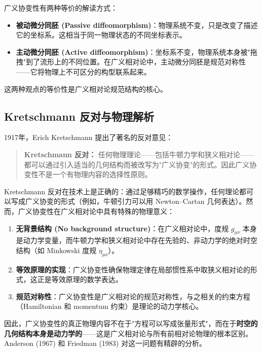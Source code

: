\begin{note}[主动与被动观点]
广义协变性有两种等价的解读方式：
\begin{itemize}
    \item \textbf{被动微分同胚 (Passive diffeomorphism)}：物理系统不变，只是改变了描述它的坐标系。这相当于同一物理状态的不同坐标表示。
    \item \textbf{主动微分同胚 (Active diffeomorphism)}：坐标系不变，物理系统本身被"拖拽"到了流形上的不同位置。在广义相对论中，主动微分同胚是规范对称性——它将物理上不可区分的构型联系起来。
\end{itemize}
这两种观点的等价性是广义相对论规范结构的核心。
\end{note}

\subsection{Kretschmann 反对与物理解析}

1917年，Erich Kretschmann 提出了著名的反对意见：

\begin{quote}
    \textbf{Kretschmann 反对：} 任何物理理论——包括牛顿力学和狭义相对论——都可以通过引入适当的几何结构而被改写为"广义协变"的形式。因此广义协变性不是一个有物理内容的选择性原则。
\end{quote}

\begin{note}
Kretschmann 反对在技术上是正确的：通过足够精巧的数学操作，任何理论都可以写成广义协变的形式（例如，牛顿引力可以用 Newton--Cartan 几何表达）。然而，广义协变性在广义相对论中具有特殊的物理意义：
\begin{enumerate}
    \item \textbf{无背景结构 (No background structure)}：在广义相对论中，度规 $g_{\mu\nu}$ 本身是动力学变量，而牛顿力学和狭义相对论中存在先验的、非动力学的绝对时空结构（如 Minkowski 度规 $\eta_{\mu\nu}$）。
    \item \textbf{等效原理的实现}：广义协变性确保物理定律在局部惯性系中取狭义相对论的形式，这正是等效原理的数学表达。
    \item \textbf{规范对称性}：广义协变性是广义相对论的规范对称性，与之相关的约束方程（Hamiltonian 和 momentum 约束）是理论的动力学核心。
\end{enumerate}
因此，广义协变性的真正物理内容不在于"方程可以写成张量形式"，而在于\textbf{时空的几何结构本身是动力学的}——这是广义相对论与所有前相对论物理的根本区别。Anderson (1967) 和 Friedman (1983) 对这一问题有精辟的分析。
\end{note}

